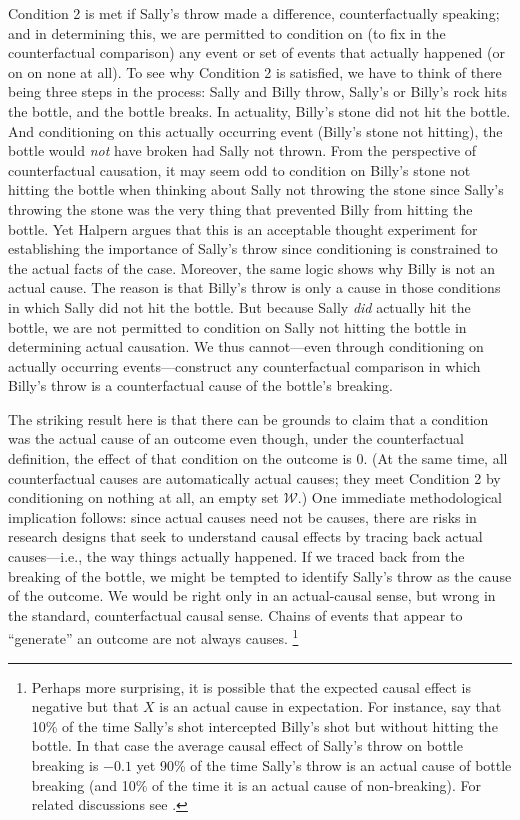 \documentclass[12pt,]{book}
\let\rmarkdownfootnote\footnote%
\def\footnote{\protect\rmarkdownfootnote}
\begin{document}
Condition 2 is met if Sally's throw made a difference, counterfactually speaking; and in determining this, we are permitted to condition on (to fix in the counterfactual comparison) any event or set of events that actually happened (or on on none at all). To see why Condition 2 is satisfied, we have to think of there being three steps in the process: Sally and Billy throw, Sally's or Billy's rock hits the bottle, and the bottle breaks. In actuality, Billy's stone did not hit the bottle. And conditioning on this actually occurring event (Billy's stone not hitting), the bottle would \emph{not} have broken had Sally not thrown. From the perspective of counterfactual causation, it may seem odd to condition on Billy's stone not hitting the bottle when thinking about Sally not throwing the stone since Sally's throwing the stone was the very thing that prevented Billy from hitting the bottle. Yet Halpern argues that this is an acceptable thought experiment for establishing the importance of Sally's throw since conditioning is constrained to the actual facts of the case. Moreover, the same logic shows why Billy is not an actual cause. The reason is that Billy's throw is only a cause in those conditions in which Sally did not hit the bottle. But because Sally \emph{did} actually hit the bottle, we are not permitted to condition on Sally not hitting the bottle in determining actual causation. We thus cannot---even through conditioning on actually occurring events---construct any counterfactual comparison in which Billy's throw is a counterfactual cause of the bottle's breaking.

The striking result here is that there can be grounds to claim that a condition was the actual cause of an outcome even though, under the counterfactual definition, the effect of that condition on the outcome is 0. (At the same time, all counterfactual causes are automatically actual causes; they meet Condition 2 by conditioning on nothing at all, an empty set \(\mathcal W\).) One immediate methodological implication follows: since actual causes need not be causes, there are risks in research designs that seek to understand causal effects by tracing back actual causes---i.e., the way things actually happened. If we traced back from the breaking of the bottle, we might be tempted to identify Sally's throw as the cause of the outcome. We would be right only in an actual-causal sense, but wrong in the standard, counterfactual causal sense. Chains of events that appear to ``generate'' an outcome are not always causes. \footnote{Perhaps more surprising, it is possible that the expected causal effect is negative but that \(X\) is an actual cause in expectation. For instance, say that 10\% of the time Sally's shot intercepted Billy's shot but without hitting the bottle. In that case the average causal effect of Sally's throw on bottle breaking is \(-0.1\) yet 90\% of the time Sally's throw is an actual cause of bottle breaking (and 10\% of the time it is an actual cause of non-breaking). For related discussions see \citet{menzies1989probabilistic}.}
\end{document}

